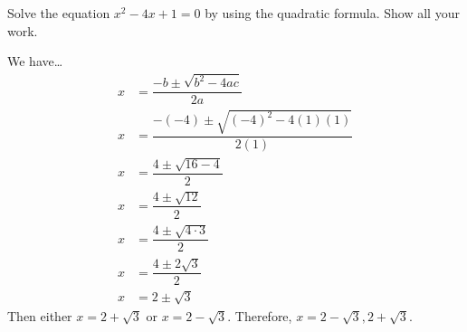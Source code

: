 \documentclass[11pt,letterpaper]{article}
\begin{document}
\newpage





 Solve the equation $x^2 - 4x + 1= 0$ by using the quadratic formula. Show all your work. \pspace

\sol We have\dots \pspace
	\[
	\begin{aligned}
	x&= \dfrac{-b \pm \sqrt{b^2 - 4ac}}{2a} \\[0.3cm]
	x&= \dfrac{-(-4) \pm \sqrt{(-4)^2 - 4(1)(1)}}{2(1)} \\[0.3cm]
	x&= \dfrac{4 \pm \sqrt{16 - 4}}{2} \\[0.3cm]
	x&= \dfrac{4 \pm \sqrt{12}}{2} \\[0.3cm]
	x&= \dfrac{4 \pm \sqrt{4 \cdot 3}}{2} \\[0.3cm]
	x&= \dfrac{4 \pm 2 \sqrt{3}}{2} \\[0.3cm]
	x&= 2 \pm \sqrt{3}
	\end{aligned}
	\] \pspace
Then either $x= 2 + \sqrt{3}$ or $x= 2 - \sqrt{3}$. Therefore, $x= 2 - \sqrt{3}, 2 + \sqrt{3}$. 


\end{document}
